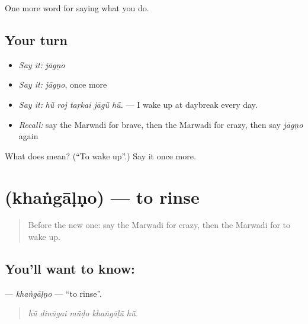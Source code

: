 \begin{grammarlens}[title={What you've built}]
One more word for saying what you do.
\end{grammarlens}

\subsection*{Your turn}
\begin{itemize}
\raggedright
  \item \emph{Say it:} \emph{jāgṇo}
  \item \emph{Say it:} \emph{jāgṇo}, once more
  \item \emph{Say it:} \emph{hū̃ roj taṛkai jāgū̃ hū̃.} — I wake up at daybreak every day.
  \item \emph{Recall:} say the Marwadi for brave, then the Marwadi for crazy, then say \emph{jāgṇo} again
\end{itemize}

\begin{tcolorbox}[breakable,colback=teal!4,colframe=teal!35!black,title={Before you move on}]
What does  mean? (\textquotedblleft{}To wake up\textquotedblright{}.) Say it once more.
\end{tcolorbox}
\section[\texorpdfstring{\mw{खंगाळणो} (khaṅgāḷṇo)}{खंगाळणो (khaṅgāḷṇo)}]{ (khaṅgāḷṇo) — to rinse}

\label{lesson:MW-C166-khangalno}



\begin{quote}
Before the new one: say the Marwadi for crazy, then the Marwadi for to wake up.
\end{quote}

\subsection*{You'll want to know: }
\textbf{} — \emph{khaṅgāḷṇo} — \textquotedblleft{}to rinse\textquotedblright{}.

\begin{quote}
    
\end{quote}

\begin{quote}
\emph{hū̃ dinūgai mū̃ḍo khaṅgāḷū̃ hū̃.}
\end{quote}

